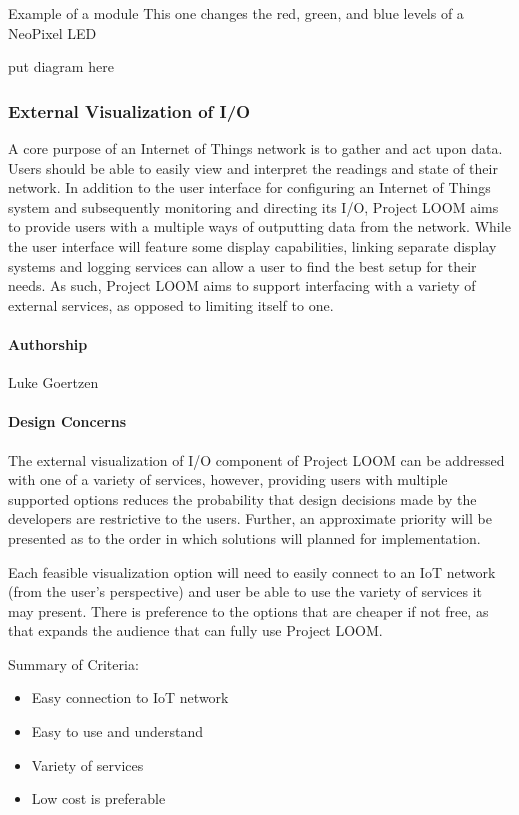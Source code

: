 \documentclass[onecolumn, draftclsnofoot,10pt, compsoc]{IEEEtran}
\begin{document}
Example of a module
This one changes the red, green, and blue levels of a NeoPixel LED

put diagram here\\



\subsubsection{External Visualization of I/O}
A core purpose of an Internet of Things network is to gather and act upon data. Users should be able to easily view and interpret the readings and state of their network. In addition to the user interface for configuring an Internet of Things system and subsequently monitoring and directing its I/O, Project LOOM aims to provide users with a multiple ways of outputting data from the network. While the user interface will feature some display capabilities, linking separate display systems and logging services can allow a user to find the best setup for their needs. As such, Project LOOM aims to support interfacing with a variety of external services, as opposed to limiting itself to one.

\paragraph{Authorship}
Luke Goertzen

\paragraph{Design Concerns}
The external visualization of I/O component of Project LOOM can be addressed with one of a variety of services, however, providing users with multiple supported options reduces the probability that design decisions made by the developers are restrictive to the users. Further, an approximate priority will be presented as to the order in which solutions will planned for implementation.

Each feasible visualization option will need to easily connect to an IoT network (from the user's perspective) and user be able to use the variety of services it may present. There is preference to the options that are cheaper if not free, as that expands the audience that can fully use Project LOOM.

Summary of Criteria:
\begin{itemize}[noitemsep,topsep=-10pt]
    \item Easy connection to IoT network
    \item Easy to use and understand
    \item Variety of services
    \item Low cost is preferable
\end{itemize}
\end{document}
